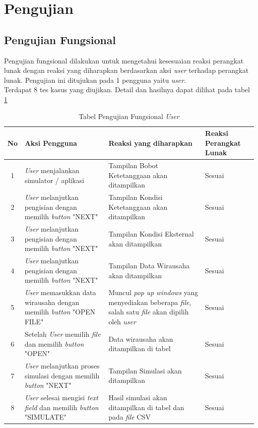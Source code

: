 \section{Pengujian}
\subsection{Pengujian Fungsional}
Pengujian fungsional dilakukan untuk mengetahui kesesuaian reaksi perangkat lunak dengan reaksi yang diharapkan berdasarkan aksi \textit{user} terhadap perangkat lunak. Pengujian ini ditujukan pada 1 pengguna yaitu \textit{user}.\\
Terdapat 8 tes kasus yang diujikan. Detail dan hasilnya dapat dilihat pada tabel \ref{tabelFungsional}

\begin{table}[H]
\centering
\caption{Tabel Pengujian Fungsional \textit{User}}
\begin{tabular}{|c|p{6cm}|p{4cm}|p{2cm}|}
\hline
No & Aksi Pengguna & Reaksi yang diharapkan & Reaksi Perangkat Lunak\\
\hline
1 & \textit{User} menjalankan simulator / aplikasi & Tampilan Bobot Ketetanggaan akan ditampilkan & Sesuai\\
\hline
2 & \textit{User} melanjutkan pengisian dengan memilih \textit{button} "NEXT" & Tampilan Kondisi Ketetanggaan akan ditampilkan & Sesuai\\
\hline
3 & \textit{User} melanjutkan pengisian dengan memilih \textit{button} "NEXT" & Tampilan Kondisi Eksternal akan ditampilkan & Sesuai\\
\hline
4 & \textit{User} melanjutkan pengisian dengan memilih \textit{button} "NEXT" & Tampilan Data Wirausaha akan ditampilkan & Sesuai\\
\hline
5 & \textit{User} memasukkan data wirausaha dengan memilih \textit{button} "OPEN FILE" & Muncul \textit{pop up windows} yang menyediakan beberapa \textit{file}, salah satu \textit{file} akan dipilih oleh \textit{user} & Sesuai\\
\hline
6 & Setelah \textit{User} memilih \textit{file} dan memilih \textit{button} "OPEN" & Data wirausaha akan ditampilkan di tabel & Sesuai\\
\hline
7 & \textit{User} melanjutkan proses simulasi dengan memilih \textit{button} "NEXT" & Tampilan Simulasi akan ditampilkan & Sesuai\\
\hline
8 & \textit{User} selesai mengisi \textit{text field} dan memilih \textit{button} "SIMULATE" & Hasil simulasi akan ditampilkan di tabel dan pada \textit{file} CSV & Sesuai\\
\hline 

\end{tabular}
\label{tabelFungsional}
\end{table} 

